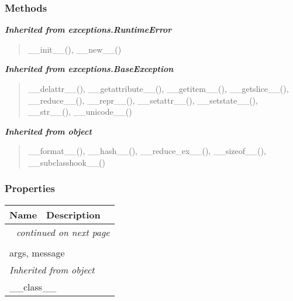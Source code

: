   \subsubsection{Methods}


\large{\textbf{\textit{Inherited from exceptions.RuntimeError}}}

\begin{quote}
\_\_init\_\_(), \_\_new\_\_()
\end{quote}

\large{\textbf{\textit{Inherited from exceptions.BaseException}}}

\begin{quote}
\_\_delattr\_\_(), \_\_getattribute\_\_(), \_\_getitem\_\_(), \_\_getslice\_\_(), \_\_reduce\_\_(), \_\_repr\_\_(), \_\_setattr\_\_(), \_\_setstate\_\_(), \_\_str\_\_(), \_\_unicode\_\_()
\end{quote}

\large{\textbf{\textit{Inherited from object}}}

\begin{quote}
\_\_format\_\_(), \_\_hash\_\_(), \_\_reduce\_ex\_\_(), \_\_sizeof\_\_(), \_\_subclasshook\_\_()
\end{quote}


  \subsubsection{Properties}

    \vspace{-1cm}
\hspace{\varindent}\begin{longtable}{|p{\varnamewidth}|p{\vardescrwidth}|l}
\cline{1-2}
\cline{1-2} \centering \textbf{Name} & \centering \textbf{Description}& \\
\cline{1-2}
\endhead\cline{1-2}\multicolumn{3}{r}{\small\textit{continued on next page}}\\\endfoot\cline{1-2}
\endlastfoot\multicolumn{2}{|l|}{\textit{Inherited from exceptions.BaseException}}\\
\multicolumn{2}{|p{\varwidth}|}{\raggedright args, message}\\
\cline{1-2}
\multicolumn{2}{|l|}{\textit{Inherited from object}}\\
\multicolumn{2}{|p{\varwidth}|}{\raggedright \_\_class\_\_}\\
\cline{1-2}
\end{longtable}

